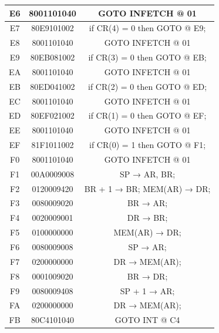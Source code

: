 \begin{center}
\begin{tabular}{|c|c|c|}
        E6    & 8001101040   & GOTO INFETCH @ 01                     \\
        \hline
        E7    & 80E9101002   & if CR(4) = 0 then GOTO @ E9;          \\
        \hline
        E8    & 8001101040   & GOTO INFETCH @ 01                     \\
        \hline
        E9    & 80EB081002   & if CR(3) = 0 then GOTO @ EB;          \\
        \hline
        EA    & 8001101040   & GOTO INFETCH @ 01                     \\
        \hline
        EB    & 80ED041002   & if CR(2) = 0 then GOTO @ ED;          \\
        \hline
        EC    & 8001101040   & GOTO INFETCH @ 01                     \\
        \hline
        ED    & 80EF021002   & if CR(1) = 0 then GOTO @ EF;          \\
        \hline
        EE    & 8001101040   & GOTO INFETCH @ 01                     \\
        \hline
        EF    & 81F1011002   & if CR(0) = 1 then GOTO @ F1;          \\
        \hline
        F0    & 8001101040   & GOTO INFETCH @ 01                     \\
        \hline
        F1    & 00A0009008   & SP → AR, BR;                          \\
        \hline
        F2    & 0120009420   & BR + 1 → BR; MEM(AR) → DR;            \\
        \hline
        F3    & 0080009020   & BR → AR;                              \\
        \hline
        F4    & 0020009001   & DR → BR;                              \\
        \hline
        F5    & 0100000000   & MEM(AR) → DR;                         \\
        \hline
        F6    & 0080009008   & SP → AR;                              \\
        \hline
        F7    & 0200000000   & DR → MEM(AR);                         \\
        \hline
        F8    & 0001009020   & BR → DR;                              \\
        \hline
        F9    & 0080009408   & SP + 1 → AR;                          \\
        \hline
        FA    & 0200000000   & DR → MEM(AR);                         \\
        \hline
        FB    & 80C4101040   & GOTO INT @ C4                         \\
        \hline
    \end{tabular}
\end{center}



